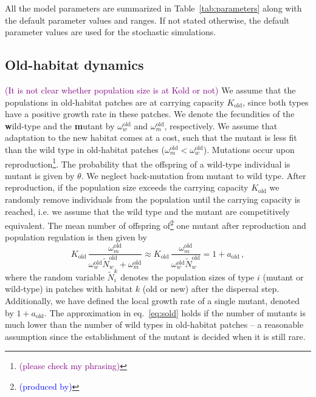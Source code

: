 \documentclass[a4paper,11pt]{article}
\newcommand{\florence}[1]{\textcolor{purple}{(#1)}} %
\newcommand{\francois}[1]{\textcolor{blue}{(#1)}}
\newcommand{\chg}[1]{\textcolor{change}{#1}}
\begin{document}
All the model parameters are summarized in Table~\ref{tab:parameters} along with the default parameter values and ranges. If not stated otherwise, the default parameter values are used for the stochastic simulations. 


\subsection*{Old-habitat dynamics}
\florence{It is not clear whether population size is at Kold or not}
\chg{We assume that the populations in old-habitat patches \linelabel{R1-9-3}are at carrying capacity $K_{\text{old}}$, since both types have a positive growth rate in these patches.} We denote the fecundities of the \textbf{w}ild-type and the \textbf{m}utant by $\omega^\text{old}_w$ and $\omega^\text{old}_m$, respectively. We assume that adaptation to the new habitat comes at a cost, such that the mutant is less fit than the wild type in old-habitat patches ($\omega^\text{old}_m<\omega^\text{old}_w$).
%
Mutations occur upon reproduction\footnote{\florence{please check my phrasing}}. The probability that the offspring of a wild-type individual is mutant is given by $\theta$. We neglect back-mutation from mutant to wild type.
\chg{After reproduction, if the population size exceeds the carrying capacity $K_{\text{old}}$ we randomly remove individuals from the population until the carrying capacity is reached\linelabel{AE-3}, i.e. we assume that the wild type and the mutant are competitively equivalent. The mean number of offspring of\footnote{\francois{produced by}} one mutant after reproduction and population regulation is then given by   
\begin{equation}\label{eq:sold}
     K_{\text{old}}\, \frac{\omega^\text{old}_m}{\omega^\text{old}_w \widetilde{N}^{\text{old}}_w + \omega^\text{old}_m}\approx K_{\text{old}}\, \frac{\omega^\text{old}_m}{\omega^\text{old}_w \widetilde{N}^{\text{old}}_w} =1 + a_{\text{old}} \, ,
\end{equation}
where the random variable $\widetilde{N}_{i}^{k}$ denotes the population sizes of type $i$ (mutant or wild-type) in patches with habitat $k$ (old or new) after the dispersal step. Additionally, we have defined the local growth rate of a single mutant, denoted by $1+a_{\text{old}}$. \linelabel{R1-11}The approximation in eq.~\eqref{eq:sold} holds if the number of mutants is much lower than the number of wild types in old-habitat patches -- a reasonable assumption since the establishment of the mutant is decided when it is still rare.}
\end{document}
